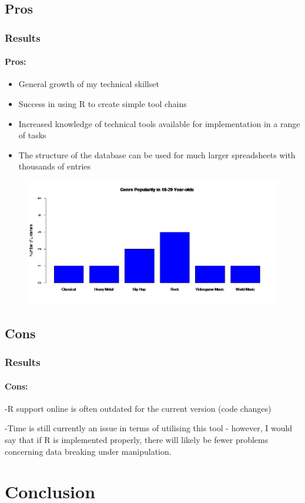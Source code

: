 \documentclass[aspectratio=1610]{beamer}
\begin{document}
\subsection{Pros}
\begin{frame}
\frametitle{Results}
\framesubtitle{Pros:}
\begin{itemize}
\item General growth of my technical skillset
\item Success in using R to create simple tool chains
\item Increased knowledge of technical tools available for implementation in a range of tasks
\item The structure of the database can be used for much larger spreadsheets with thousands of entries
\end{itemize}
\begin{figure}[h]
\includegraphics[scale=0.3]{Final}
\end{figure}
\end{frame}
\subsection{Cons}
\begin{frame}
\frametitle{Results}
\framesubtitle{Cons:}
\item -R support online is often outdated for the current version (code changes)
\item -Time is still currently an issue in terms of utilising this tool - however, I would say that if R is implemented properly, there will likely be fewer problems concerning data breaking under manipulation. 
\end{frame}
\section{Conclusion}
\end{document}
